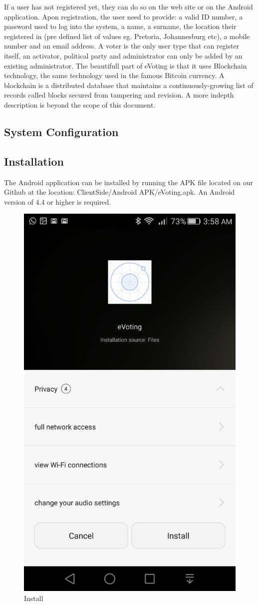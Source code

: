 \documentclass[11pt]{article}
\begin{document}
	If a user has not registered yet, they can do so on the web site or on the Android application. Apon registration, the user need to provide: a valid ID number, a password used to log into the system, a name, a surname, the location their registered in (pre defined list of values eg. Pretoria, Johannesburg etc), a mobile number and an email address. A voter is the only user type that can register itself, an activator, political party and administrator can only be added by an existing administrator.\newline\newline
	The beautifull part of eVoting is that it uses Blockchain technology, the same technology used in the famous Bitcoin currency. A blockchain is a distributed database that maintains a continuously-growing list of records called blocks secured from tampering and revision. A more indepth description is beyond the scope of this document.
	
	\subsection{System Configuration}

	\subsection{Installation}
	The Android application can be installed by running the APK file located on our Github at the location:  ClientSide/Android APK/eVoting.apk. An Android version of 4.4 or higher is required.\newline
					\begin{figure}[H]
						\centering
						\includegraphics[width=0.3\linewidth]{../Images/UserManual/install.png}
						\caption{Install}
					\end{figure}
					
\end{document}
